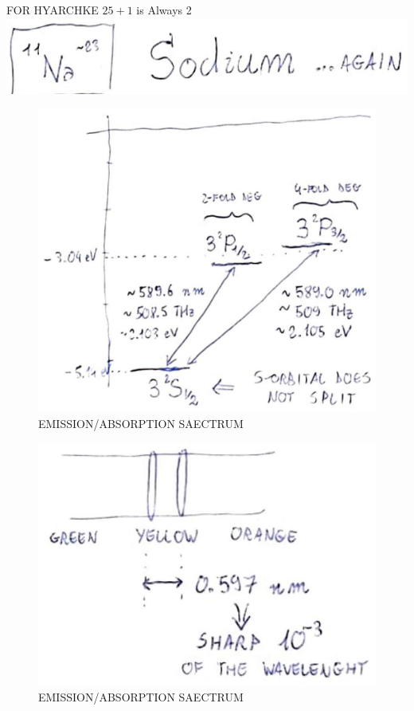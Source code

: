 \documentclass[10pt]{article}
\begin{document}
FOR HYARCHKE $25+1$ is Always 2\\
\includegraphics[max width=\textwidth, center]{2025_10_16_e34e240cf6beac2f9e0dg-5}

\begin{figure}[h]
\begin{center}
  \includegraphics[width=\textwidth]{2025_10_16_e34e240cf6beac2f9e0dg-5(2)}
\captionsetup{labelformat=empty}
\caption{EMISSION/ABSORPTION SAECTRUM}
\end{center}
\end{figure}

\begin{figure}[h]
\begin{center}
\captionsetup{labelformat=empty}
\caption{EMISSION/ABSORPTION SAECTRUM}
  \includegraphics[width=\textwidth]{2025_10_16_e34e240cf6beac2f9e0dg-5(3)}
\end{center}
\end{figure}
\end{document}
